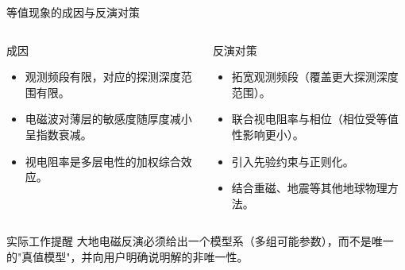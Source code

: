 \documentclass[10pt,aspectratio=169,fontset=none]{ctexbeamer}
\begin{document}
    \begin{frame}{等值现象的成因与反演对策}
        \begin{columns}[T]
            \begin{block}{成因}
                \begin{itemize}
                    \item 观测频段有限，对应的探测深度范围有限。
                    \item 电磁波对薄层的敏感度随厚度减小呈指数衰减。
                    \item 视电阻率是多层电性的加权综合效应。
                \end{itemize}
            \end{block}

            \begin{block}{反演对策}
                \begin{itemize}
                    \item 拓宽观测频段（覆盖更大探测深度范围）。
                    \item 联合视电阻率与相位（相位受等值性影响更小）。
                    \item 引入先验约束与正则化。
                    \item 结合重磁、地震等其他地球物理方法。
                \end{itemize}
            \end{block}
        \end{columns}
        \vspace{0.3em}
        \begin{talert}{实际工作提醒}
            大地电磁反演必须给出\alert{一个模型系（多组可能参数）}，而不是唯一的"真值模型"，并向用户明确说明解的非唯一性。
        \end{talert}
    \end{frame}
\end{document}
